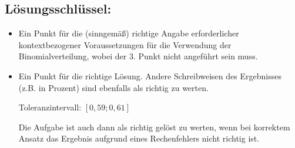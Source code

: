 \begin{langesbeispiel}
{\begin{enumerate}
	\subsection{Lösungsschlüssel:}
	
\begin{itemize}
	\item    Ein Punkt für die (sinngemäß) richtige Angabe erforderlicher kontextbezogener Voraussetzungen für die Verwendung der Binomialverteilung, wobei der 3. Punkt nicht angeführt sein muss.
	\item   Ein Punkt für die richtige Lösung. Andere Schreibweisen des Ergebnisses (z.B. in Prozent) sind ebenfalls als richtig zu werten. 
	
	Toleranzintervall: $[0,59; 0,61]$ 
	
	Die Aufgabe ist auch dann als richtig gelöst zu werten, wenn bei korrektem Ansatz das Ergebnis aufgrund eines Rechenfehlers nicht richtig ist.
\end{itemize}

\end{enumerate}}
		\end{langesbeispiel}